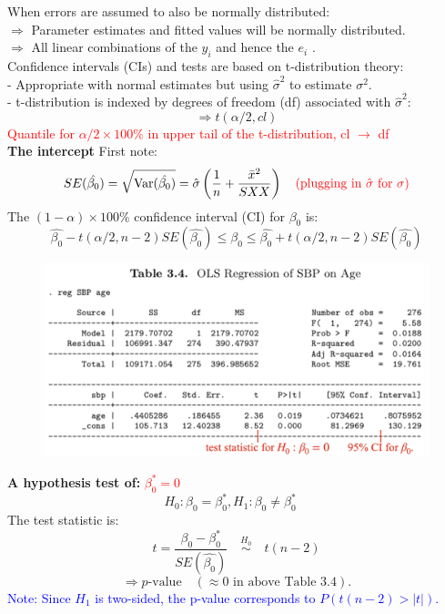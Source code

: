 \documentclass[14pt]{extarticle}
\begin{document}
\noindent
When errors are assumed to also be normally distributed:\\
$\Rightarrow$ Parameter estimates and fitted values will be normally distributed.\\
$\Rightarrow$ All linear combinations of the $ y_i $ and hence the $ e_i $ .\\
Confidence intervals (CIs) and tests are based on t-distribution theory:\\
 - Appropriate with normal estimates but using $\hat{\sigma}^2$ to estimate $ \sigma^2$.\\
 - t-distribution is indexed by degrees of freedom (df) associated with $\hat{\sigma}^2$:
\[
\Rightarrow t(\alpha/2, cl)
\]
\textcolor{red}{Quantile for $ \alpha / 2 \times 100\% $ in upper tail of the t-distribution, cl $\rightarrow$ df} \\
\textbf{The intercept}
First note:
\[
SE(\hat{\beta_0}) = \sqrt{\text{Var}(\hat{\beta_0})}
= \hat{\sigma} \left( \frac{1}{n} + \frac{\bar{x}^2}{SXX} \right) \quad \textcolor{red}{\text{(plugging in } \hat{\sigma} \text{ for } \sigma \text{)}}
\]
The $(1-\alpha) \times 100\%$ confidence interval (CI) for $\beta_0$ is:
\[
\hat{\beta_0} - t\left(\alpha/2, n-2\right) SE(\hat{\beta_0}) \leq \beta_0 \leq \hat{\beta_0} + t\left(\alpha/2, n-2\right) SE(\hat{\beta_0})
\]
\begin{figure}[H]
    \centering
    \includegraphics[width=1\textwidth]{fig7.png}
\end{figure}
\noindent
\textbf{A hypothesis test of: }\textcolor{red}{ $\beta_0^* = 0 $\text{)}}
\[
H_0: \beta_0 = \beta_0^* , 
H_1: \beta_0 \neq \beta_0^* \quad 
\]
The test statistic is:
\[
t = \frac{\beta_0 - \beta_0^*}{SE(\hat{\beta_0})} \quad \overset{H_0}{\sim} \quad t(n-2)
\]
\[
\Rightarrow p\text{-value} \quad (\approx 0 \text{ in above Table 3.4}).
\]
\textcolor{blue}{Note: Since $H_1$ is two-sided, the p-value corresponds to $P\left(t(n-2) > |t|\right)$.}
\end{document}
